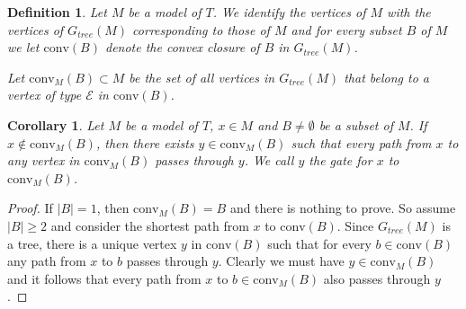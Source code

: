 \documentclass{amsart}
\newcommand{\E}{\mathcal{E}}
\newcommand{\conv}{\mathrm{conv}}
\newtheorem{definition}[defi]{Definition}
\newtheorem{corollary}[defi]{Corollary}
\begin{document}
 


\begin{definition}\label{def:convex}
Let $M$ be a model of $T$. We identify the vertices of $M$ with the vertices of $G_{tree}(M)$ corresponding to those of $M$ and for every subset $B$ of $M$ we let $\conv(B)$ denote the convex closure of $B$ in $G_{tree}(M)$.

Let $\conv_M(B)\subset M$ be the set of all vertices in $G_{tree}(M)$  that belong to a vertex of type $\E$ in $\conv(B)$.
\end{definition}


\begin{corollary}\label{cor:gate}
    Let $M$ be a model of $T$, $x \in M$ and $B\neq\emptyset$ be a subset of $M$. 
    If $x \notin \conv_M(B)$, then there exists $y \in \conv_M(B)$ such that
    every path from $x$ to  any vertex in $\conv_M(B)$ passes through $y$. We call $y$ the gate for $x$ to $\conv_M(B)$. 
\end{corollary}
\begin{proof}
If $|B|=1$, then $\conv_M(B)=B$ and there is nothing to prove. So assume $|B|\geq 2$ and consider the shortest path from $x$ to $\conv(B)$. Since $G_{tree}(M)$ is a tree, there is a unique vertex $y$ in $\conv(B)$ such that for every $b\in \conv(B)$ any path from $x$ to $b$ passes through $y$. Clearly we must have $y\in \conv_M(B)$ and it follows that every  path from $x$ to $b\in\conv_M(B)$ also passes through $y$.
\end{proof}
\end{document}
